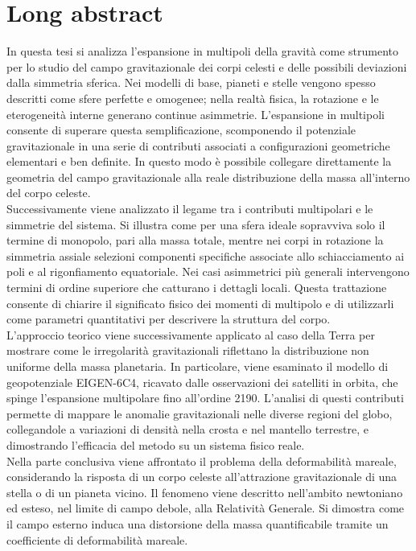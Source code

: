 \documentclass[12pt, twoside, italian]{book}
\begin{document}
	\chapter*{Long abstract}
In questa tesi si analizza l’espansione in multipoli della gravità come strumento per lo studio del campo gravitazionale dei corpi celesti e delle possibili deviazioni dalla simmetria sferica. Nei modelli di base, pianeti e stelle vengono spesso descritti come sfere perfette e omogenee; nella realtà fisica, la rotazione e le eterogeneità interne generano continue asimmetrie. L’espansione in multipoli consente di superare questa semplificazione, scomponendo il potenziale gravitazionale in una serie di contributi associati a configurazioni geometriche elementari e ben definite. In questo modo è possibile collegare direttamente la geometria del campo gravitazionale alla reale distribuzione della massa all’interno del corpo celeste. \\

Successivamente viene analizzato il legame tra i contributi multipolari e le simmetrie del sistema. Si illustra come per una sfera ideale sopravviva solo il termine di monopolo, pari alla massa totale, mentre nei corpi in rotazione la simmetria assiale selezioni componenti specifiche associate allo schiacciamento ai poli e al rigonfiamento equatoriale. Nei casi asimmetrici più generali intervengono termini di ordine superiore che catturano i dettagli locali. Questa trattazione consente di chiarire il significato fisico dei momenti di multipolo e di utilizzarli come parametri quantitativi per descrivere la struttura del corpo. \\

L’approccio teorico viene successivamente applicato al caso della Terra per mostrare come le irregolarità gravitazionali riflettano la distribuzione non uniforme della massa planetaria. In particolare, viene esaminato il modello di geopotenziale EIGEN-6C4, ricavato dalle osservazioni dei satelliti in orbita, che spinge l’espansione multipolare fino all'ordine 2190. L’analisi di questi contributi permette di mappare le anomalie gravitazionali nelle diverse regioni del globo, collegandole a variazioni di densità nella crosta e nel mantello terrestre, e dimostrando l'efficacia del metodo su un sistema fisico reale. \\

Nella parte conclusiva viene affrontato il problema della deformabilità mareale, considerando la risposta di un corpo celeste all’attrazione gravitazionale di una stella o di un pianeta vicino. Il fenomeno viene descritto nell'ambito newtoniano ed esteso, nel limite di campo debole, alla Relatività Generale. Si dimostra come il campo esterno induca una distorsione della massa quantificabile tramite un coefficiente di deformabilità mareale. \\
\end{document}
